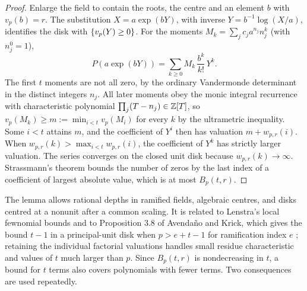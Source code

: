 \begin{proof}
Enlarge the field to contain the roots, the centre and an element $b$ with $v_p(b)=r$.
The substitution $X=a\exp(bY)$, with inverse $Y=b^{-1}\log(X/a)$, identifies the disk
with $\{v_p(Y)\ge0\}$. For the moments $M_k=\sum_jc_ja^{n_j}n_j^k$ (with $n_j^0=1$),
\[
 P(a\exp(bY))=\sum_{k\ge0}M_k\,\frac{b^k}{k!}\,Y^k .
\]
The first $t$ moments are not all zero, by the ordinary Vandermonde determinant in the
distinct integers $n_j$. All later moments obey the monic integral recurrence with
characteristic polynomial $\prod_j(T-n_j)\in\mathbb{Z}[T]$, so
$v_p(M_k)\ge m:=\min_{i<t}v_p(M_i)$ for every $k$ by the ultrametric inequality. Some
$i<t$ attains $m$, and the coefficient of $Y^i$ then has valuation $m+w_{p,r}(i)$. When
$w_{p,r}(k)>\max_{i<t}w_{p,r}(i)$, the coefficient of $Y^k$ has strictly larger valuation.
The series converges on the closed unit disk because $w_{p,r}(k)\to\infty$. Strassmann's
theorem bounds the number of zeros by the last index of a coefficient of largest absolute
value, which is at most $B_p(t,r)$.
\end{proof}

The lemma allows rational depths in ramified fields, algebraic centres, and disks centred
at a nonunit after a common scaling. It is related to Lenstra's local fewnomial bounds and
to Proposition 3.8 of Avenda\~no and Krick, which gives the bound $t-1$ in a principal-unit
disk when $p>e+t-1$ for ramification index $e$
\cite{Lenstra1999Factorization,Avendano2011Sharp}; retaining the individual factorial
valuations handles small residue characteristic and values of $t$ much larger than $p$.
Since $B_p(t,r)$ is nondecreasing in $t$, a bound for $t$ terms also covers polynomials
with fewer terms. Two consequences are used repeatedly.


